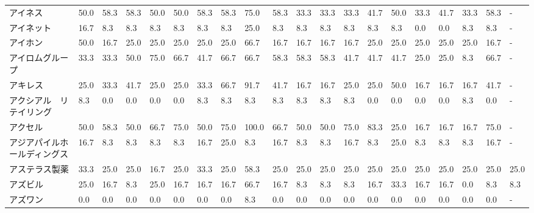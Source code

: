 \begin{tabular}{llllllllllllllllllll}
アイネス            &   50.0 &   58.3 &      58.3 &      50.0 &       50.0 &   58.3 &   58.3 &   75.0 &    58.3 &    33.3 &   33.3 &  33.3 &   41.7 &    50.0 &    33.3 &  41.7 &  33.3 &  58.3 &     - \\
アイネット           &   16.7 &    8.3 &       8.3 &       8.3 &        8.3 &    8.3 &    8.3 &   25.0 &     8.3 &     8.3 &    8.3 &   8.3 &    8.3 &     8.3 &     0.0 &   0.0 &   8.3 &   8.3 &     - \\
アイホン            &   50.0 &   16.7 &      25.0 &      25.0 &       25.0 &   25.0 &   25.0 &   66.7 &    16.7 &    16.7 &   16.7 &  16.7 &   25.0 &    25.0 &    25.0 &  25.0 &  25.0 &  16.7 &     - \\
アイロムグループ        &   33.3 &   33.3 &      50.0 &      75.0 &       66.7 &   41.7 &   66.7 &   66.7 &    58.3 &    58.3 &   58.3 &  41.7 &   41.7 &    41.7 &    25.0 &  25.0 &   8.3 &  66.7 &     - \\
アキレス            &   25.0 &   33.3 &      41.7 &      25.0 &       25.0 &   33.3 &   66.7 &   91.7 &    41.7 &    16.7 &   16.7 &  25.0 &   25.0 &    50.0 &    16.7 &  16.7 &  16.7 &  41.7 &     - \\
アクシアル　リテイリング    &    8.3 &    0.0 &       0.0 &       0.0 &        0.0 &    8.3 &    8.3 &    8.3 &     8.3 &     8.3 &    8.3 &   8.3 &    0.0 &     0.0 &     0.0 &   0.0 &   8.3 &   0.0 &     - \\
アクセル            &   50.0 &   58.3 &      50.0 &      66.7 &       75.0 &   50.0 &   75.0 &  100.0 &    66.7 &    50.0 &   50.0 &  75.0 &   83.3 &    25.0 &    16.7 &  16.7 &  16.7 &  75.0 &     - \\
アジアパイルホールディングス  &   16.7 &    8.3 &       8.3 &       8.3 &        8.3 &   16.7 &   25.0 &    8.3 &    16.7 &     8.3 &    8.3 &  16.7 &    8.3 &    25.0 &     8.3 &   8.3 &   8.3 &  16.7 &     - \\
アステラス製薬         &   33.3 &   25.0 &      25.0 &      16.7 &       25.0 &   33.3 &   25.0 &   58.3 &    25.0 &    25.0 &   25.0 &  25.0 &   25.0 &    25.0 &    25.0 &  25.0 &  25.0 &  25.0 &  25.0 \\
アズビル            &   25.0 &   16.7 &       8.3 &      25.0 &       16.7 &   16.7 &   16.7 &   66.7 &    16.7 &     8.3 &    8.3 &   8.3 &   16.7 &    33.3 &    16.7 &  16.7 &   0.0 &   8.3 &   8.3 \\
アズワン            &    0.0 &    0.0 &       0.0 &       0.0 &        0.0 &    0.0 &    0.0 &    8.3 &     0.0 &     0.0 &    0.0 &   0.0 &    0.0 &     0.0 &     0.0 &   0.0 &   0.0 &   0.0 &     - \\

\end{tabular}
